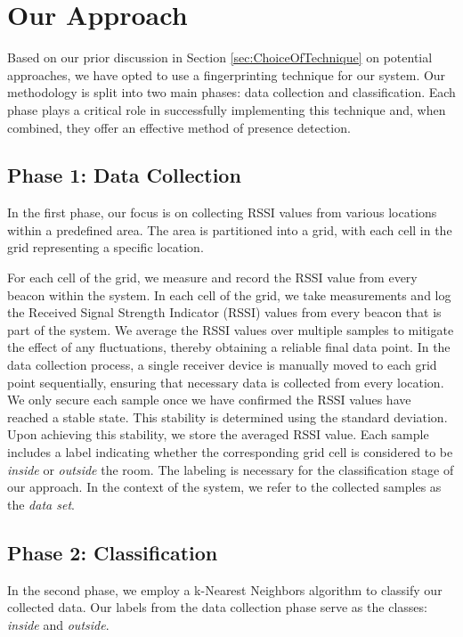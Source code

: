 \section{Our Approach}\label{sec:our_approach}
Based on our prior discussion in Section \ref{sec:ChoiceOfTechnique} on potential approaches, we have opted to use a fingerprinting technique for our system.
Our methodology is split into two main phases: data collection and classification.
Each phase plays a critical role in successfully implementing this technique and, when combined, they offer an effective method of presence detection.

\subsection{Phase 1: Data Collection}\label{sec:phase1_data_collection}
In the first phase, our focus is on collecting RSSI values from various locations within a predefined area. The area is partitioned into a grid, with each cell in the grid representing a specific location. 

For each cell of the grid, we measure and record the RSSI value from every beacon within the system.
In each cell of the grid, we take measurements and log the Received Signal Strength Indicator (RSSI) values from every beacon that is part of the system. 
We average the RSSI values over multiple samples to mitigate the effect of any fluctuations, thereby obtaining a reliable final data point. 
In the data collection process, a single receiver device is manually moved to each grid point sequentially, ensuring that necessary data is collected from every location.
We only secure each sample once we have confirmed the RSSI values have reached a stable state. This stability is determined using the standard deviation.
Upon achieving this stability, we store the averaged RSSI value.
Each sample includes a label indicating whether the corresponding grid cell is considered to be \textit{inside} or \textit{outside} the room.
The labeling is necessary for the classification stage of our approach.
In the context of the system, we refer to the collected samples as the \textit{data set}.


\subsection{Phase 2: Classification}\label{sec:phase2_classification}
In the second phase, we employ a k-Nearest Neighbors algorithm to classify our collected data. Our labels from the data collection phase serve as the classes: \textit{inside} and \textit{outside}.

